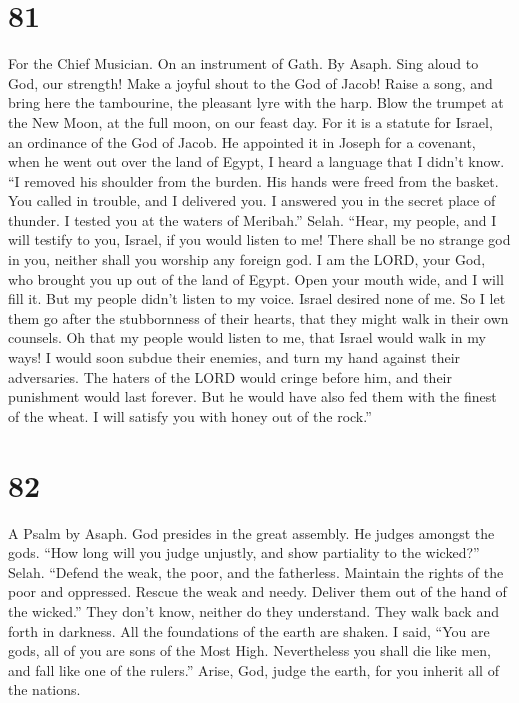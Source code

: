 \hypertarget{section-73}{%
\section{81}\label{section-73}}

For the Chief Musician. On an instrument of Gath. By Asaph.
 Sing aloud to God, our strength! Make a joyful shout to
the God of Jacob!  Raise a song, and bring here the
tambourine, the pleasant lyre with the harp.  Blow the
trumpet at the New Moon, at the full moon, on our feast day.
 For it is a statute for Israel, an ordinance of the God
of Jacob.  He appointed it in Joseph for a covenant, when
he went out over the land of Egypt, I heard a language that I didn't
know.  ``I removed his shoulder from the burden. His hands
were freed from the basket.  You called in trouble, and I
delivered you. I answered you in the secret place of thunder. I tested
you at the waters of Meribah.'' Selah.  ``Hear, my people,
and I will testify to you, Israel, if you would listen to me!
 There shall be no strange god in you, neither shall you
worship any foreign god.  I am the LORD, your God, who
brought you up out of the land of Egypt. Open your mouth wide, and I
will fill it.  But my people didn't listen to my voice.
Israel desired none of me.  So I let them go after the
stubbornness of their hearts, that they might walk in their own
counsels.  Oh that my people would listen to me, that
Israel would walk in my ways!  I would soon subdue their
enemies, and turn my hand against their adversaries.  The
haters of the LORD would cringe before him, and their punishment would
last forever.  But he would have also fed them with the
finest of the wheat. I will satisfy you with honey out of the rock.''

\hypertarget{section-74}{%
\section{82}\label{section-74}}

A Psalm by Asaph.  God presides in the great assembly. He
judges amongst the gods.  ``How long will you judge
unjustly, and show partiality to the wicked?'' Selah. 
``Defend the weak, the poor, and the fatherless. Maintain the rights of
the poor and oppressed.  Rescue the weak and needy.
Deliver them out of the hand of the wicked.''  They don't
know, neither do they understand. They walk back and forth in darkness.
All the foundations of the earth are shaken.  I said,
``You are gods, all of you are sons of the Most High. 
Nevertheless you shall die like men, and fall like one of the rulers.''
 Arise, God, judge the earth, for you inherit all of the
nations.

